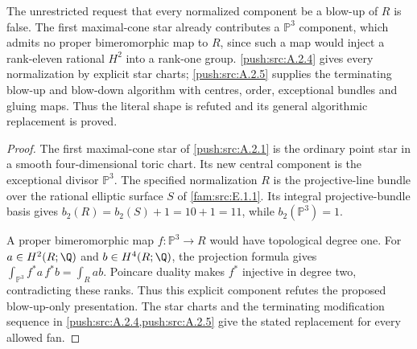 \begin{remark}\label{push:src:A.2.3}\label{push:A23}
The unrestricted request that every normalized component
be a blow-up of $R$ is false. The first maximal-cone
star already contributes a $\mathbb P^3$ component,
which admits no proper bimeromorphic map to $R$, since
such a map would inject a rank-eleven rational $H^2$
into a rank-one group. \ref{push:src:A.2.4} gives every normalization
by explicit star charts; \ref{push:src:A.2.5} supplies the terminating
blow-up and blow-down algorithm with centres, order,
exceptional bundles and gluing maps. Thus the literal
shape is refuted and its general algorithmic
replacement is proved.
\end{remark}
\begin{proof}

The first maximal-cone star of \ref{push:src:A.2.1} is the
ordinary point star in a smooth four-dimensional toric chart.
Its new central component is the exceptional divisor
$\mathbb P^3$. The specified normalization $R$ is the
projective-line bundle over the rational elliptic surface $S$
of \ref{fam:src:E.1.1}. Its integral projective-bundle basis
gives $b_2(R)=b_2(S)+1=10+1=11$, while
$b_2(\mathbb P^3)=1$.

A proper bimeromorphic map $f:\mathbb P^3\to R$ would have
topological degree one. For $a\in H^2(R;\Q)$ and
$b\in H^4(R;\Q)$, the projection formula gives
$\int_{\mathbb P^3}f^*a\,f^*b=\int_Rab$.
Poincare duality makes $f^*$ injective in degree two, contradicting
these ranks. Thus this explicit component refutes the proposed
blow-up-only presentation. The star charts and the terminating
modification sequence in \ref{push:src:A.2.4,push:src:A.2.5}
give the stated replacement for every allowed fan.

\end{proof}
